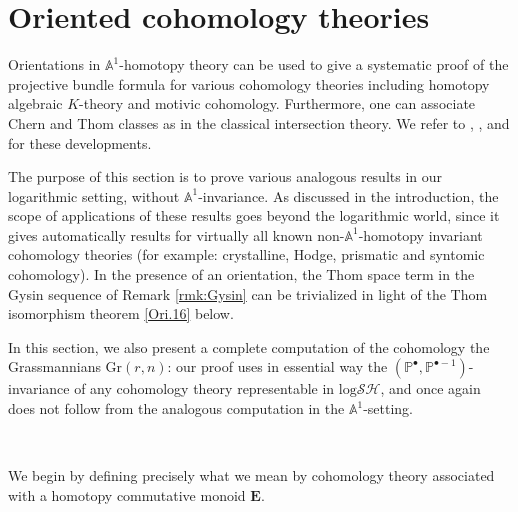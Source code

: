 \documentclass[11pt, a4paper]{amsart}
\theoremstyle{definition}
\numberwithin{equation}{subsection}
\renewcommand{\P}{\mathbb{P}}
\newcommand{\A}{\mathbb{A}}
\newcommand{\Gr}{{\mathrm{Gr}}}
\newcommand{\ringE}{\mathbf{E}}
\newcommand{\inflogSH}{\mathrm{log}\mathcal{SH}}
\begin{document}
\newpage



\section{Oriented cohomology theories}
\label{section:oct}

Orientations in $\A^1$-homotopy theory can be used to give a systematic proof of the 
projective bundle formula for 
various cohomology theories including homotopy algebraic $K$-theory and motivic cohomology.
Furthermore, one can associate Chern and Thom classes as in the classical intersection theory.
We refer to \cite{zbMATH02216798}, \cite{zbMATH05367298}, and \cite{Deg08} for these developments.

The purpose of this section is to
prove various analogous results in our logarithmic setting, without $\mathbb{A}^1$-invariance. As discussed in the introduction, the scope of applications of these results goes beyond the logarithmic world, since it gives automatically results for virtually all known non-$\mathbb{A}^1$-homotopy invariant cohomology theories (for example: crystalline, Hodge, prismatic and syntomic cohomology). In the presence of an orientation, the Thom space term in the Gysin sequence of Remark \ref{rmk:Gysin} can be trivialized in light of the Thom isomorphism theorem \ref{Ori.16} below.

In this section, we also present a complete computation of the cohomology the Grassmannians $\Gr(r,n)$: our proof uses in essential way the $(\P^\bullet, \P^{\bullet-1})$-invariance of any cohomology theory representable in $\inflogSH$, and once again does not follow from the analogous computation in the $\mathbb{A}^1$-setting. 

\

We begin by defining precisely what we mean by cohomology theory associated with a homotopy commutative monoid $\ringE$.
\end{document}
